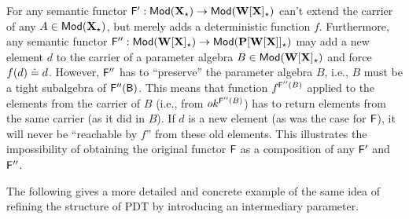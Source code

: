 \begin{example}
For any semantic functor ${\sf {F'}}: {\sf {Mod}}({\bf X_\star}) \to{\sf {Mod}}({\bf W[X]_\star})$ 
can't extend the carrier of any $A\in {\sf {Mod}}({\bf X_\star})$, but 
merely adds a deterministic function $f$. Furthermore, any semantic functor 
${\sf {F''}}: {\sf {Mod}}({\bf W[X]_\star}) \to{\sf {Mod}}({\bf P[W[X]]_\star})$ may add a
new element $d$ to the carrier of a parameter algebra $B\in{\sf {Mod}}({\bf W[X]_\star})$ and force
$f(d)\mathrel{\dot{=} } d$. However, ${\sf {F''}}$ has to ``preserve'' the parameter algebra
$B$, i.e., $B$ must be a tight subalgebra of
${\sf {F''(B)}}$. This means that function $f^{{\sf {F}}''(B)}$ applied to the elements
from the carrier of $B$ (i.e., from $ok^{{\sf {F}}''(B)}$) has to return elements
from the same carrier (as it did in $B$). If $d$ is a new element (as was the
case for ${\sf {F}}$), it will never be ``reachable by $f$'' from these old
elements. This illustrates the impossibility
of obtaining the original functor ${\sf {F}}$ as a composition of any ${\sf {F}}'$
and ${\sf {F}}''$.
\end{example}
%
The following gives a more detailed and concrete example of the same idea of refining the structure of
PDT by introducing an intermediary parameter. 
